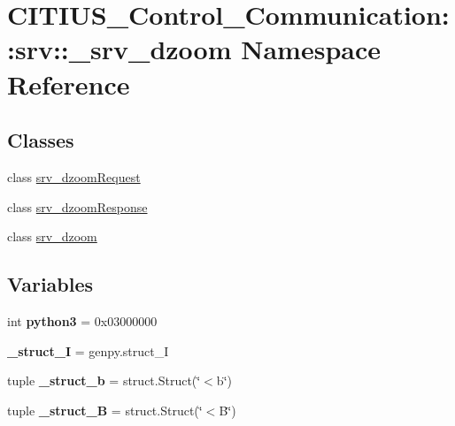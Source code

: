 \hypertarget{namespace_c_i_t_i_u_s___control___communication_1_1srv_1_1__srv__dzoom}{\section{\-C\-I\-T\-I\-U\-S\-\_\-\-Control\-\_\-\-Communication\-:\-:srv\-:\-:\-\_\-srv\-\_\-dzoom \-Namespace \-Reference}
\label{namespace_c_i_t_i_u_s___control___communication_1_1srv_1_1__srv__dzoom}
}
\subsection*{\-Classes}
\begin{DoxyCompactItemize}
\item 
class \hyperlink{class_c_i_t_i_u_s___control___communication_1_1srv_1_1__srv__dzoom_1_1srv__dzoom_request}{srv\-\_\-dzoom\-Request}
\item 
class \hyperlink{class_c_i_t_i_u_s___control___communication_1_1srv_1_1__srv__dzoom_1_1srv__dzoom_response}{srv\-\_\-dzoom\-Response}
\item 
class \hyperlink{class_c_i_t_i_u_s___control___communication_1_1srv_1_1__srv__dzoom_1_1srv__dzoom}{srv\-\_\-dzoom}
\end{DoxyCompactItemize}
\subsection*{\-Variables}
\begin{DoxyCompactItemize}
\item 
\hypertarget{namespace_c_i_t_i_u_s___control___communication_1_1srv_1_1__srv__dzoom_a95f82ae74943032da2748132f753c7b2}{int {\bfseries python3} = 0x03000000}\label{namespace_c_i_t_i_u_s___control___communication_1_1srv_1_1__srv__dzoom_a95f82ae74943032da2748132f753c7b2}

\item 
\hypertarget{namespace_c_i_t_i_u_s___control___communication_1_1srv_1_1__srv__dzoom_a049fcc4040b21aa2fc5705ff0891cfcb}{{\bfseries \-\_\-struct\-\_\-\-I} = genpy.\-struct\-\_\-\-I}\label{namespace_c_i_t_i_u_s___control___communication_1_1srv_1_1__srv__dzoom_a049fcc4040b21aa2fc5705ff0891cfcb}

\item 
\hypertarget{namespace_c_i_t_i_u_s___control___communication_1_1srv_1_1__srv__dzoom_afc3b66b0fccd441db57b224b41ce2087}{tuple {\bfseries \-\_\-struct\-\_\-b} = struct.\-Struct(\char`\"{}$<$b\char`\"{})}\label{namespace_c_i_t_i_u_s___control___communication_1_1srv_1_1__srv__dzoom_afc3b66b0fccd441db57b224b41ce2087}

\item 
\hypertarget{namespace_c_i_t_i_u_s___control___communication_1_1srv_1_1__srv__dzoom_ad49c8eee8a15a75c1f9d0d9bf9bf944d}{tuple {\bfseries \-\_\-struct\-\_\-\-B} = struct.\-Struct(\char`\"{}$<$\-B\char`\"{})}\label{namespace_c_i_t_i_u_s___control___communication_1_1srv_1_1__srv__dzoom_ad49c8eee8a15a75c1f9d0d9bf9bf944d}

\end{DoxyCompactItemize}


